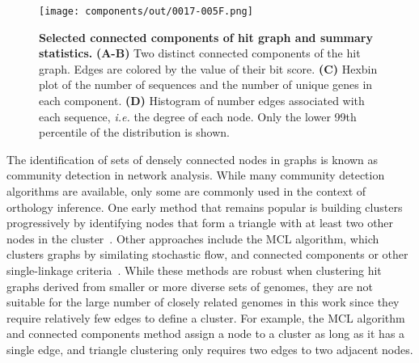 \begin{figure}[h!]
\texttt{[image: components/out/0017-005F.png]}
\centering
\caption{\textbf{Selected connected components of hit graph and summary statistics.}
\textbf{(A-B)} Two distinct connected components of the hit graph. Edges are colored by the value of their bit score. \textbf{(C)} Hexbin plot of the number of sequences and the number of unique genes in each component. \textbf{(D)} Histogram of number edges associated with each sequence, \textit{i.e.} the degree of each node. Only the lower 99th percentile of the distribution is shown.}
\label{fig:components}
\end{figure}

The identification of sets of densely connected nodes in graphs is known as community detection in network analysis. While many community detection algorithms are available, only some are commonly used in the context of orthology inference. One early method that remains popular is building clusters progressively by identifying nodes that form a triangle with at least two other nodes in the cluster~\cite{Tatusov1997, Jensen2007}. Other approaches include the MCL algorithm, which clusters graphs by similating stochastic flow, and connected components or other single-linkage criteria~\cite{Remm2001, Enright2002, Li2003, Emms2015, Train2017, Cosentino2018}. While these methods are robust when clustering hit graphs derived from smaller or more diverse sets of genomes, they are not suitable for the large number of closely related genomes in this work since they require relatively few edges to define a cluster. For example, the MCL algorithm and connected components method assign a node to a cluster as long as it has a single edge, and triangle clustering only requires two edges to two adjacent nodes.

